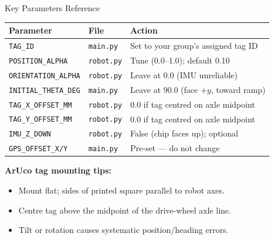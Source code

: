 \documentclass{beamer}
\begin{document}
\begin{frame}{Key Parameters Reference}
    \begin{tabular}{lll}
        \hline
        \textbf{Parameter} & \textbf{File} & \textbf{Action} \\
        \hline
        \texttt{TAG\_ID} & \texttt{main.py} & Set to your group's assigned tag ID \\
        \texttt{POSITION\_ALPHA} & \texttt{robot.py} & Tune (0.0--1.0); default 0.10 \\
        \texttt{ORIENTATION\_ALPHA} & \texttt{robot.py} & Leave at 0.0 (IMU unreliable) \\
        \texttt{INITIAL\_THETA\_DEG} & \texttt{main.py} & Leave at 90.0 (face $+y$, toward ramp) \\
        \texttt{TAG\_X\_OFFSET\_MM} & \texttt{robot.py} & 0.0 if tag centred on axle midpoint \\
        \texttt{TAG\_Y\_OFFSET\_MM} & \texttt{robot.py} & 0.0 if tag centred on axle midpoint \\
        \texttt{IMU\_Z\_DOWN} & \texttt{robot.py} & False (chip faces up); optional \\
        \texttt{GPS\_OFFSET\_X/Y} & \texttt{main.py} & Pre-set --- do not change \\
        \hline
    \end{tabular}

    \vspace{0.4cm}
    \textbf{ArUco tag mounting tips:}
    \begin{itemize}
        \item Mount flat; sides of printed square parallel to robot axes.
        \item Centre tag above the midpoint of the drive-wheel axle line.
        \item Tilt or rotation causes systematic position/heading errors.
    \end{itemize}
\end{frame}
\end{document}
